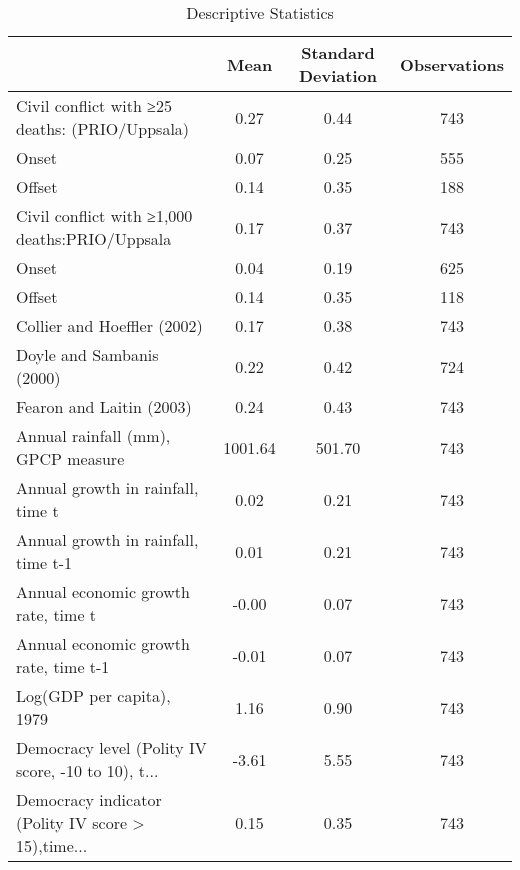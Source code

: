 \begin{table}
\centering
\caption{Descriptive Statistics}
\begin{tabular}{lccc}
\toprule
{} &    Mean & Standard Deviation & Observations \\
\midrule
Civil conflict with ≥25 deaths: (PRIO/Uppsala)     &    0.27 &               0.44 &          743 \\
Onset                                              &    0.07 &               0.25 &          555 \\
Offset                                             &    0.14 &               0.35 &          188 \\
Civil conflict with ≥1,000 deaths:PRIO/Uppsala     &    0.17 &               0.37 &          743 \\
Onset                                              &    0.04 &               0.19 &          625 \\
Offset                                             &    0.14 &               0.35 &          118 \\
Collier and Hoeffler (2002)                        &    0.17 &               0.38 &          743 \\
Doyle and Sambanis (2000)                          &    0.22 &               0.42 &          724 \\
Fearon and Laitin (2003)                           &    0.24 &               0.43 &          743 \\
Annual rainfall (mm), GPCP measure                 & 1001.64 &             501.70 &          743 \\
Annual growth in rainfall, time t                  &    0.02 &               0.21 &          743 \\
Annual growth in rainfall, time t-1                &    0.01 &               0.21 &          743 \\
Annual economic growth rate, time t                &   -0.00 &               0.07 &          743 \\
Annual economic growth rate, time t-1              &   -0.01 &               0.07 &          743 \\
Log(GDP per capita), 1979                          &    1.16 &               0.90 &          743 \\
Democracy level (Polity IV score, -10 to 10), t... &   -3.61 &               5.55 &          743 \\
Democracy indicator (Polity IV score > 15),time... &    0.15 &               0.35 &          743 \\

\end{tabular}
\end{table}
